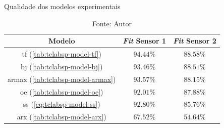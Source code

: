\begin{table}[h]
	\centering
	\caption{Qualidade dos modelos experimentais}
	\label{tab:modelos_experimentais_fit}
	\begin{tabular}{c|cc} \toprule
		{Modelo}		                            			&	{\textit{Fit} Sensor 1}	    &	{\textit{Fit} Sensor 2}			\\ \midrule
		\acrshort{tf} (\cref{tab:tclabsp-model-tf})				&   $94.44\%$                   &   $88.58\%$                       \\
		\acrshort{bj} (\cref{tab:tclabsp-model-bj})				&   $93.46\%$                   &   $88.51\%$                       \\ 
		\acrshort{armax} (\cref{tab:tclabsp-model-armax})		&   $93.57\%$                   &   $88.15\%$                       \\
		\acrshort{oe} (\cref{tab:tclabsp-model-oe})				&   $92.01\%$                   &   $87.88\%$                       \\
		\acrshort{ss} (\cref{eq:tclabsp-model-ss})			    &   $92.80\%$                   &   $85.76\%$                       \\
		\acrshort{arx}	(\cref{tab:tclabsp-model-arx})		    &   $67.52\%$                   &   $54.64\%$                       \\ \bottomrule
	\end{tabular}
	\caption*{Fonte: Autor}
\end{table}